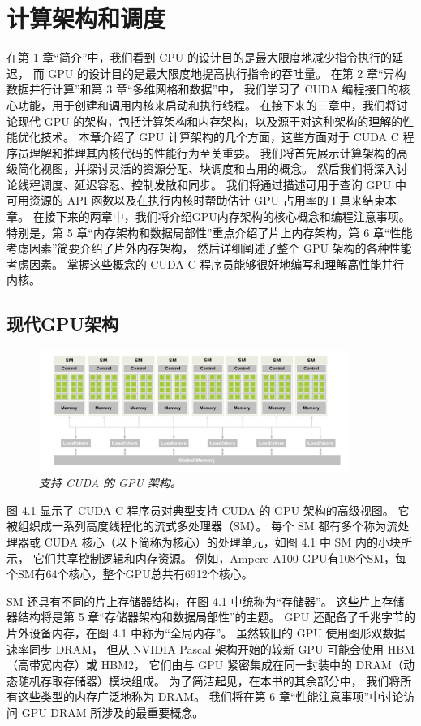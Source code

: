 \section{计算架构和调度}
在第 1 章“简介”中，我们看到 CPU 的设计目的是最大限度地减少指令执行的延迟，
而 GPU 的设计目的是最大限度地提高执行指令的吞吐量。 在第 2 章“异构数据并行计算”和第 3 章“多维网格和数据”中，
我们学习了 CUDA 编程接口的核心功能，用于创建和调用内核来启动和执行线程。 
在接下来的三章中，我们将讨论现代 GPU 的架构，包括计算架构和内存架构，以及源于对这种架构的理解的性能优化技术。 
本章介绍了 GPU 计算架构的几个方面，这些方面对于 CUDA C 程序员理解和推理其内核代码的性能行为至关重要。 
我们将首先展示计算架构的高级简化视图，并探讨灵活的资源分配、块调度和占用的概念。 
然后我们将深入讨论线程调度、延迟容忍、控制发散和同步。 
我们将通过描述可用于查询 GPU 中可用资源的 API 函数以及在执行内核时帮助估计 GPU 占用率的工具来结束本章。 
在接下来的两章中，我们将介绍GPU内存架构的核心概念和编程注意事项。 
特别是，第 5 章“内存架构和数据局部性”重点介绍了片上内存架构，第 6 章“性能考虑因素”简要介绍了片外内存架构，
然后详细阐述了整个 GPU 架构的各种性能考虑因素。 掌握这些概念的 CUDA C 程序员能够很好地编写和理解高性能并行内核。

\subsection{现代GPU架构}
\begin{figure}[H]
	\centering
	\includegraphics[width=0.9\textwidth]{figs/F4.1.png}
	\caption{\textit{支持 CUDA 的 GPU 架构。}}
\end{figure}

图 4.1 显示了 CUDA C 程序员对典型支持 CUDA 的 GPU 架构的高级视图。 它被组织成一系列高度线程化的流式多处理器（SM）。 
每个 SM 都有多个称为流处理器或 CUDA 核心（以下简称为核心）的处理单元，如图 4.1 中 SM 内的小块所示，
它们共享控制逻辑和内存资源。 例如，Ampere A100 GPU有108个SM，每个SM有64个核心，整个GPU总共有6912个核心。

SM 还具有不同的片上存储器结构，在图 4.1 中统称为“存储器”。 这些片上存储器结构将是第 5 章“存储器架构和数据局部性”的主题。 
GPU 还配备了千兆字节的片外设备内存，在图 4.1 中称为“全局内存”。 虽然较旧的 GPU 使用图形双数据速率同步 DRAM，
但从 NVIDIA Pascal 架构开始的较新 GPU 可能会使用 HBM（高带宽内存）或 HBM2，
它们由与 GPU 紧密集成在同一封装中的 DRAM（动态随机存取存储器）模块组成。 为了简洁起见，在本书的其余部分中，
我们将所有这些类型的内存广泛地称为 DRAM。 我们将在第 6 章“性能注意事项”中讨论访问 GPU DRAM 所涉及的最重要概念。

